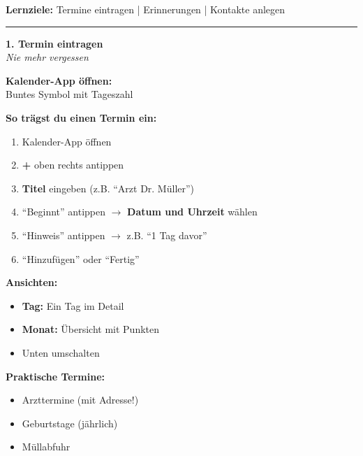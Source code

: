 \documentclass[a4paper,landscape,8pt]{extarticle}
\begin{document}

 \hfill
{\footnotesize\textbf{Lernziele:} Termine eintragen | Erinnerungen | Kontakte anlegen}

\vspace{1mm}
\hrule
\vspace{1mm}

\begin{minipage}[t]{0.32\linewidth}
\begin{center}
\colorbox{calred!15}{%
\begin{minipage}{0.95\linewidth}
\vspace{2mm}
\begin{center}
{\Large\bfseries\textcolor{calred}{1. Termin eintragen}}\\[1pt]
{\footnotesize\itshape Nie mehr vergessen}
\end{center}
\vspace{2mm}
\end{minipage}%
}
\end{center}

\vspace{1mm}

\textbf{Kalender-App öffnen:}\\
Buntes Symbol mit Tageszahl

\textbf{So trägst du einen Termin ein:}
\begin{enumerate}
\item Kalender-App öffnen
\item \textbf{+} oben rechts antippen
\item \textbf{Titel} eingeben (z.B. ``Arzt Dr. Müller'')
\item ``Beginnt'' antippen $\rightarrow$ \textbf{Datum und Uhrzeit} wählen
\item ``Hinweis'' antippen $\rightarrow$ z.B. ``1 Tag davor''
\item ``Hinzufügen'' oder ``Fertig''
\end{enumerate}

\textbf{Ansichten:}
\begin{itemize}
\item \textbf{Tag:} Ein Tag im Detail
\item \textbf{Monat:} Übersicht mit Punkten
\item Unten umschalten
\end{itemize}

\textbf{Praktische Termine:}
\begin{itemize}
\item Arzttermine (mit Adresse!)
\item Geburtstage (jährlich)
\item Müllabfuhr
\end{itemize}

\end{minipage}%
\end{document}
